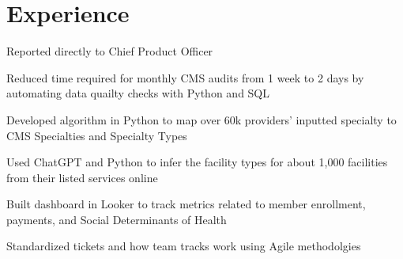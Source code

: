 \documentclass[a4paper]{deedy-resume-openfont} %
\begin{document}
\begin{minipage}[t]{0.66\textwidth} %

\section{Experience}

\vspace{\topsep} %
\begin{tightitemize}
	\item Reported directly to Chief Product Officer%
   	\item Reduced time required for monthly CMS audits from 1 week to 2 days by automating data quailty checks with Python and SQL
   	\item Developed algorithm in Python to map over 60k providers' inputted specialty to CMS Specialties and Specialty Types %
   	\item Used ChatGPT and Python to infer the facility types for about 1,000 facilities from their listed services online
   	\item Built dashboard in Looker to track metrics related to member enrollment, payments, and Social Determinants of Health
	\item Standardized tickets and how team tracks work using Agile methodolgies
\end{tightitemize}


\end{minipage}
\end{document}
